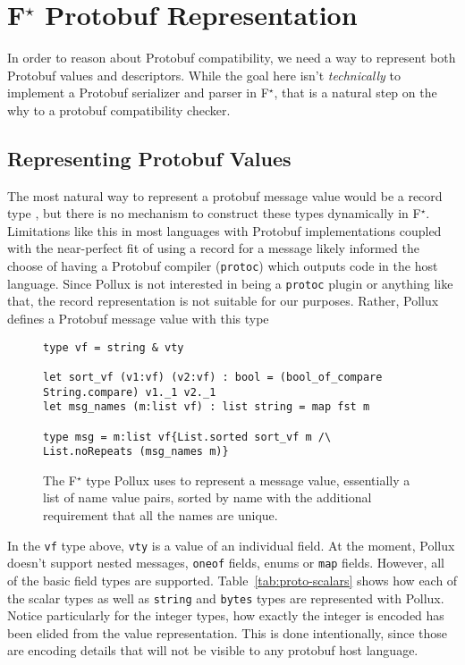 \documentclass[11pt]{article}
\theoremstyle{definition}
\theoremstyle{plain}
\newcommand{\fstar}{F$^\star$}
\begin{document}
\section{\fstar{} Protobuf Representation}

In order to reason about Protobuf compatibility, we need a way to represent both
Protobuf values and descriptors. While the goal here isn't \emph{technically} to
implement a Protobuf serializer and parser in \fstar{}, that is a natural step
on the why to a protobuf compatibility checker.

\subsection{Representing Protobuf Values}

The most natural way to represent a protobuf message value would be a record
type \cite{swamy2023proof}, but there is no mechanism to construct these types
dynamically in \fstar{}. Limitations like this in most languages with Protobuf
implementations coupled with the near-perfect fit of using a record for a
message likely informed the choose of having a Protobuf compiler
(\texttt{protoc}) which outputs code in the host language. Since Pollux is not
interested in being a \texttt{protoc} plugin or anything like that, the record
representation is not suitable for our purposes. Rather, Pollux defines a
Protobuf message value with this type


\begin{figure}[H]
  \centering
\begin{lstlisting}[language=caml]
type vf = string & vty

let sort_vf (v1:vf) (v2:vf) : bool = (bool_of_compare String.compare) v1._1 v2._1
let msg_names (m:list vf) : list string = map fst m

type msg = m:list vf{List.sorted sort_vf m /\ List.noRepeats (msg_names m)} 
\end{lstlisting}

  \caption[]{The \fstar{} type Pollux uses to represent a message value,
    essentially a list of name value pairs, sorted by name with the additional
    requirement that all the names are unique.}
  \label{fig:fstar-proto-msg-type}
\end{figure}

In the \texttt{vf} type above, \texttt{vty} is a value of an individual
field. At the moment, Pollux doesn't support nested messages, \texttt{oneof}
fields, enums or \texttt{map} fields. However, all of the basic field types are
supported. Table~\ref{tab:proto-scalars} shows how each of the scalar types as
well as \texttt{string} and \texttt{bytes} types are represented with
Pollux. Notice particularly for the integer types, how exactly the integer is
encoded has been elided from the value representation. This is done
intentionally, since those are encoding details that will not be visible to any
protobuf host language.
\end{document}
